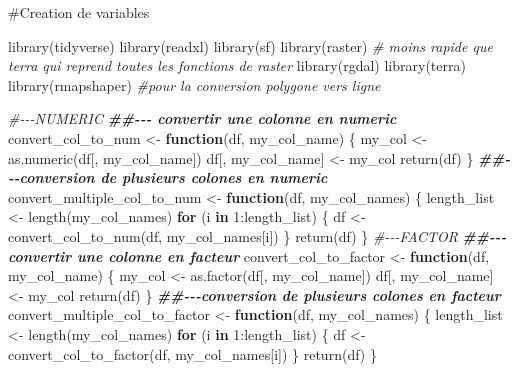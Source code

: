 \documentclass[
  12pt,
  american,
  a4paper,
  extrafontsizes,onecolumn,openright
  ]{memoir}
\newenvironment{Shaded}{\begin{snugshade}}{\end{snugshade}}
\newcommand{\CommentTok}[1]{\textcolor[rgb]{0.56,0.35,0.01}{\textit{#1}}}
\newcommand{\ControlFlowTok}[1]{\textcolor[rgb]{0.13,0.29,0.53}{\textbf{#1}}}
\newcommand{\DecValTok}[1]{\textcolor[rgb]{0.00,0.00,0.81}{#1}}
\newcommand{\DocumentationTok}[1]{\textcolor[rgb]{0.56,0.35,0.01}{\textbf{\textit{#1}}}}
\newcommand{\FunctionTok}[1]{\textcolor[rgb]{0.00,0.00,0.00}{#1}}
\newcommand{\NormalTok}[1]{#1}
\newcommand{\OtherTok}[1]{\textcolor[rgb]{0.56,0.35,0.01}{#1}}
\newcommand{\SpecialCharTok}[1]{\textcolor[rgb]{0.00,0.00,0.00}{#1}}
\begin{document}
\#Creation de variables

\scriptsize

\begin{Shaded}
\begin{Highlighting}[]
\FunctionTok{library}\NormalTok{(tidyverse)}
\FunctionTok{library}\NormalTok{(readxl)}
\FunctionTok{library}\NormalTok{(sf)}
\FunctionTok{library}\NormalTok{(raster)  }\CommentTok{\# moins rapide que terra qui reprend toutes les fonctions de raster}
\FunctionTok{library}\NormalTok{(rgdal)}
\FunctionTok{library}\NormalTok{(terra)}
\FunctionTok{library}\NormalTok{(rmapshaper)  }\CommentTok{\#pour la conversion polygone vers ligne}
\end{Highlighting}
\end{Shaded}

\normalsize

\scriptsize

\begin{Shaded}
\begin{Highlighting}[]
\CommentTok{\#{-}{-}{-}NUMERIC}
\DocumentationTok{\#\#{-}{-}{-} convertir une colonne en numeric}
\NormalTok{convert\_col\_to\_num }\OtherTok{\textless{}{-}} \ControlFlowTok{function}\NormalTok{(df, my\_col\_name) \{}
\NormalTok{    my\_col }\OtherTok{\textless{}{-}} \FunctionTok{as.numeric}\NormalTok{(df[, my\_col\_name])}
\NormalTok{    df[, my\_col\_name] }\OtherTok{\textless{}{-}}\NormalTok{ my\_col}
    \FunctionTok{return}\NormalTok{(df)}
\NormalTok{\}}
\DocumentationTok{\#\#{-}{-}{-}conversion de plusieurs colones en numeric}
\NormalTok{convert\_multiple\_col\_to\_num }\OtherTok{\textless{}{-}} \ControlFlowTok{function}\NormalTok{(df, my\_col\_names) \{}
\NormalTok{    length\_list }\OtherTok{\textless{}{-}} \FunctionTok{length}\NormalTok{(my\_col\_names)}
    \ControlFlowTok{for}\NormalTok{ (i }\ControlFlowTok{in} \DecValTok{1}\SpecialCharTok{:}\NormalTok{length\_list) \{}
\NormalTok{        df }\OtherTok{\textless{}{-}} \FunctionTok{convert\_col\_to\_num}\NormalTok{(df, my\_col\_names[i])}
\NormalTok{    \}}
    \FunctionTok{return}\NormalTok{(df)}
\NormalTok{\}}
\CommentTok{\#{-}{-}{-}FACTOR}
\DocumentationTok{\#\#{-}{-}{-} convertir une colonne en facteur}
\NormalTok{convert\_col\_to\_factor }\OtherTok{\textless{}{-}} \ControlFlowTok{function}\NormalTok{(df, my\_col\_name) \{}
\NormalTok{    my\_col }\OtherTok{\textless{}{-}} \FunctionTok{as.factor}\NormalTok{(df[, my\_col\_name])}
\NormalTok{    df[, my\_col\_name] }\OtherTok{\textless{}{-}}\NormalTok{ my\_col}
    \FunctionTok{return}\NormalTok{(df)}
\NormalTok{\}}
\DocumentationTok{\#\#{-}{-}{-}conversion de plusieurs colones en facteur}
\NormalTok{convert\_multiple\_col\_to\_factor }\OtherTok{\textless{}{-}} \ControlFlowTok{function}\NormalTok{(df, my\_col\_names) \{}
\NormalTok{    length\_list }\OtherTok{\textless{}{-}} \FunctionTok{length}\NormalTok{(my\_col\_names)}
    \ControlFlowTok{for}\NormalTok{ (i }\ControlFlowTok{in} \DecValTok{1}\SpecialCharTok{:}\NormalTok{length\_list) \{}
\NormalTok{        df }\OtherTok{\textless{}{-}} \FunctionTok{convert\_col\_to\_factor}\NormalTok{(df, my\_col\_names[i])}
\NormalTok{    \}}
    \FunctionTok{return}\NormalTok{(df)}
\NormalTok{\}}
\end{Highlighting}
\end{Shaded}
\end{document}
